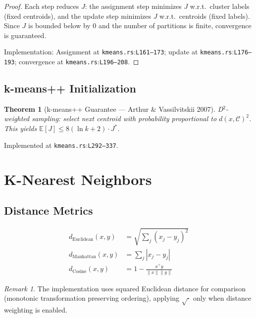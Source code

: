 \documentclass[11pt,a4paper]{article}
\newtheorem{theorem}{Theorem}[section]
\theoremstyle{remark}
\newtheorem{remark}{Remark}[section]
\newcommand{\coderef}[2]{\texttt{#1}:\texttt{L#2}}
\newcommand{\EE}{\mathbb{E}}
\begin{document}
\begin{proof}
Each step reduces $J$: the assignment step minimizes $J$ w.r.t.\ cluster
labels (fixed centroids), and the update step minimizes $J$ w.r.t.\ centroids
(fixed labels).  Since $J$ is bounded below by 0 and the number of partitions
is finite, convergence is guaranteed.

Implementation: Assignment at \coderef{kmeans.rs}{161--173}; update at
\coderef{kmeans.rs}{176--193}; convergence at \coderef{kmeans.rs}{196--208}. \checkmark
\end{proof}

\subsection{k-means++ Initialization}

\begin{theorem}[k-means++ Guarantee --- Arthur \& Vassilvitskii 2007]
\label{thm:kmeanspp}
D$^2$-weighted sampling: select next centroid with probability proportional to
$d(x, \mathcal{C})^2$.  This yields $\EE[J] \leq 8(\ln k + 2) \cdot J^*$.
\end{theorem}

Implemented at \coderef{kmeans.rs}{292--337}. \checkmark

\section{K-Nearest Neighbors}
\label{sec:knn}

\subsection{Distance Metrics}

\begin{align}
  d_{\text{Euclidean}}(x, y) &= \sqrt{\sum_j (x_j - y_j)^2} \\
  d_{\text{Manhattan}}(x, y) &= \sum_j |x_j - y_j| \\
  d_{\text{Cosine}}(x, y) &= 1 - \frac{x^\top y}{\|x\| \|y\|}
\end{align}

\begin{remark}
The implementation uses squared Euclidean distance for comparison (monotonic
transformation preserving ordering), applying $\sqrt{\cdot}$ only when
distance weighting is enabled.
\end{remark}
\end{document}

